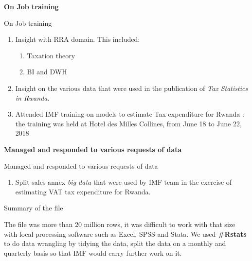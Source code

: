 \documentclass[ignorenonframetext,]{beamer}
\providecommand{\tightlist}{%
  \setlength{\itemsep}{0pt}\setlength{\parskip}{0pt}}
\begin{document}
\begin{frame}{}
\protect\hypertarget{section-1}{}

\begin{center}
\textbf{On Job training}
\end{center}

\end{frame}

\begin{frame}{On Job training}
\protect\hypertarget{on-job-training}{}

\begin{enumerate}
\tightlist
\item
  Insight with RRA domain. This included:

  \begin{enumerate}
  \tightlist
  \item
    Taxation theory
  \item
    BI and DWH
  \end{enumerate}
\item
  Insight on the various data that were used in the publication of
  \textit{Tax Statistics in Rwanda}.
\item
  Attended IMF training on models to estimate Tax expenditure for Rwanda
  : the training was held at Hotel des Milles Collines, from June 18 to
  June 22, 2018
\end{enumerate}

\end{frame}

\begin{frame}{}
\protect\hypertarget{section-2}{}

\begin{center}
\textbf{Managed and responded to various requests of data}
\end{center}

\end{frame}

\begin{frame}{Managed and responded to various requests of data}
\protect\hypertarget{managed-and-responded-to-various-requests-of-data}{}

\begin{enumerate}
\tightlist
\item
  Split sales annex \textit{big data} that were used by IMF team in the
  exercise of estimating VAT tax expenditure for Rwanda.
\end{enumerate}

\begin{block}{Summary of the file}

The file was more than 20 million rows, it was difficult to work with
that size with local processing software such as Excel, SPSS and Stata.
We used \textbf{\#Rstats} to do data wrangling by tidying the data,
split the data on a monthly and quarterly basis so that IMF would carry
further work on it.

\end{block}

\end{frame}
\end{document}
